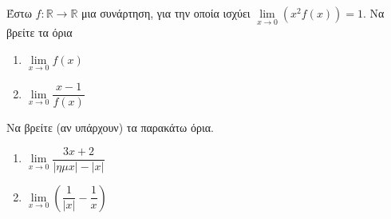 \documentclass{presentation}
\begin{document}
\begin{askisi}
  Έστω $f:\mathbb{R}\to\mathbb{R}$ μια συνάρτηση, για την οποία ισχύει $\lim\limits_{x \to 0}{ \left( x^2f(x)  \right)  }=1$.
  Να βρείτε τα όρια
  \begin{enumerate}
    \item $\lim\limits_{x \to 0}{ f(x) }$ \pause
    \item $\lim\limits_{x \to 0}{ \dfrac{x-1}{f(x)} }$
  \end{enumerate}
\end{askisi}

\begin{askisi}
  Να βρείτε (αν υπάρχουν) τα παρακάτω όρια.
  \begin{enumerate}
    \item $\lim\limits_{x \to 0}{ \dfrac{3x+2}{|ημx|-|x|} }$ \pause
    \item $\lim\limits_{x \to 0}{ \left( \dfrac{1}{|x|}-\dfrac{1}{x}  \right)  }$
  \end{enumerate}
\end{askisi}
\end{document}
